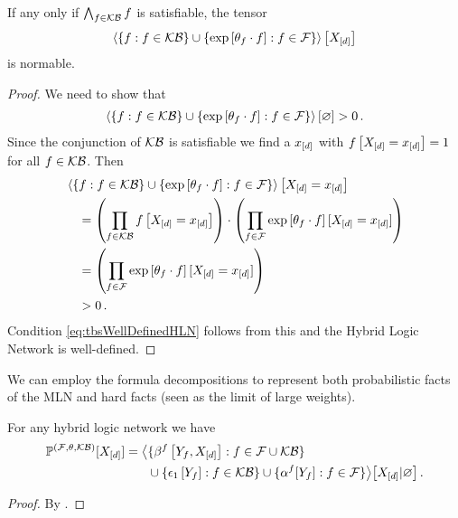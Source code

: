 \begin{theorem}
    If any only if $\bigwedge_{f\in\mathcal{KB}}f$ is satisfiable, the tensor
    \[  \left\langle 
        \{f : f\in\mathcal{KB}\} \cup \{\mathrm{exp}\left[\theta_{f}\cdot f\right] : f\in\mathcal{F}\}
    \right\rangle \left[ X_{[d]} \right] \]
    is normable.
\end{theorem}
\begin{proof}
    We need to show that
    \begin{align}
        \label{eq:tbsWellDefinedHLN}
        \left\langle \{f : f\in\mathcal{KB}\} \cup \{\mathrm{exp}\left[\theta_{f}\cdot f\right] : f\in\mathcal{F}\}\right\rangle \left[ \varnothing \right] > 0 \, .
    \end{align}
    Since the conjunction of $\mathcal{KB}$ is satisfiable we find a $x_{[d]}$ with $f\left[X_{[d]}=x_{[d]}\right]=1$ for all $f\in\mathcal{KB}$.
    Then
    \begin{align*}
        & \left\langle \{f : f\in\mathcal{KB}\} \cup \{\mathrm{exp}\left[\theta_{f}\cdot f\right] : f\in\mathcal{F}\}\right\rangle \left[ X_{[d]}=x_{[d]} \right] \\
        & \quad = \left( \prod_{f\in\mathcal{KB}}f\left[X_{[d]}=x_{[d]}\right] \right)
        \cdot \left( \prod_{f\in\mathcal{F}}\mathrm{exp}\left[\theta_{f}\cdot f\right][X_{[d]}=x_{[d]}] \right) \\
        & \quad =  \left( \prod_{f\in\mathcal{F}}\mathrm{exp}\left[\theta_{f}\cdot f\right][X_{[d]}=x_{[d]}] \right) \\
        & \quad > 0 \, .
    \end{align*}
    Condition \eqref{eq:tbsWellDefinedHLN} follows from this and the Hybrid Logic Network is well-defined.
\end{proof}



We can employ the formula decompositions to represent both probabilistic facts of the MLN and hard facts (seen as the limit of large weights).

\begin{theorem}
    \label{the:hybridNetworkRepresentation}
    For any hybrid logic network we have
    \begin{align*}
        \mathbb{P}^{(\mathcal{F},\theta,\mathcal{KB})}[X_{[d]}]
        = \big\langle 
            &\{\beta^{f}\left[Y_{f},X_{[d]}\right] : f\in\mathcal{F}\cup\mathcal{KB} \} \\
            &\cup \{\epsilon_1\left[Y_{f}\right] : f\in\mathcal{KB} \}
            \cup \{\alpha^{f}[Y_{f}] : f\in\mathcal{F} \}
         \big\rangle \big[ X_{[d]} | \varnothing \big] \, .
    \end{align*}
\end{theorem}
\begin{proof}
    By .
\end{proof}

